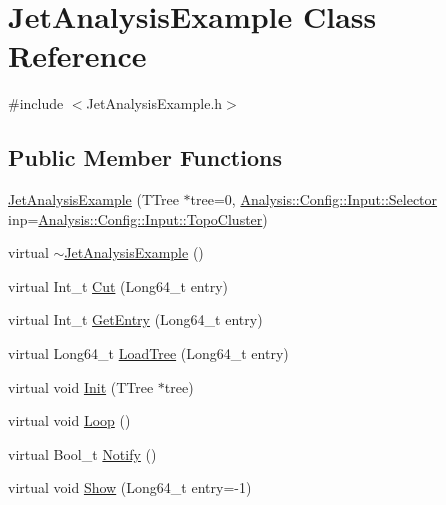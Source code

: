 \hypertarget{classJetAnalysisExample}{}\section{Jet\+Analysis\+Example Class Reference}
\label{classJetAnalysisExample}


{\ttfamily \#include $<$Jet\+Analysis\+Example.\+h$>$}

\subsection*{Public Member Functions}
\begin{DoxyCompactItemize}
\item 
\hyperlink{classJetAnalysisExample_a6fd8cda06fbe306065089fee5b4e085a}{Jet\+Analysis\+Example} (T\+Tree $\ast$tree=0, \hyperlink{namespaceAnalysis_1_1Config_1_1Input_a4fbe1ba2d37856e6b9784b4999d5268a}{Analysis\+::\+Config\+::\+Input\+::\+Selector} inp=\hyperlink{namespaceAnalysis_1_1Config_1_1Input_a4fbe1ba2d37856e6b9784b4999d5268aa314665a30d375cd30c58b262159a7742}{Analysis\+::\+Config\+::\+Input\+::\+Topo\+Cluster})
\item 
virtual \hyperlink{classJetAnalysisExample_ac8d54413228fe691e1245d4b29a0591e}{$\sim$\+Jet\+Analysis\+Example} ()
\item 
virtual Int\+\_\+t \hyperlink{classJetAnalysisExample_af358c0ef9d3d6068b3733294a1fd6777}{Cut} (Long64\+\_\+t entry)
\item 
virtual Int\+\_\+t \hyperlink{classJetAnalysisExample_af74a32953e3e35612d4213394bedfa55}{Get\+Entry} (Long64\+\_\+t entry)
\item 
virtual Long64\+\_\+t \hyperlink{classJetAnalysisExample_ace12686f6fd60623137d14e3f4128605}{Load\+Tree} (Long64\+\_\+t entry)
\item 
virtual void \hyperlink{classJetAnalysisExample_a7eb3f5d313035b4269ac4a7f6520dae7}{Init} (T\+Tree $\ast$tree)
\item 
virtual void \hyperlink{classJetAnalysisExample_a4eb41869709c3698980db5136a220fa9}{Loop} ()
\item 
virtual Bool\+\_\+t \hyperlink{classJetAnalysisExample_a9d614b680e3d5039e43f8529a195bc36}{Notify} ()
\item 
virtual void \hyperlink{classJetAnalysisExample_abde579cfda851c3669fb12feb58e7927}{Show} (Long64\+\_\+t entry=-\/1)
\end{DoxyCompactItemize}
